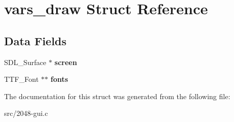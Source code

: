 \hypertarget{structvars__draw}{\section{vars\-\_\-draw Struct Reference}
\label{structvars__draw}
}
\subsection*{Data Fields}
\begin{DoxyCompactItemize}
\item 
\hypertarget{structvars__draw_a78fa3957d73de49cb81d047857504218}{S\-D\-L\-\_\-\-Surface $\ast$ {\bfseries screen}}\label{structvars__draw_a78fa3957d73de49cb81d047857504218}

\item 
\hypertarget{structvars__draw_aa5008d9463c422a331bc01967b5d942d}{T\-T\-F\-\_\-\-Font $\ast$$\ast$ {\bfseries fonts}}\label{structvars__draw_aa5008d9463c422a331bc01967b5d942d}

\end{DoxyCompactItemize}


The documentation for this struct was generated from the following file\-:\begin{DoxyCompactItemize}
\item 
src/2048-\/gui.\-c\end{DoxyCompactItemize}
